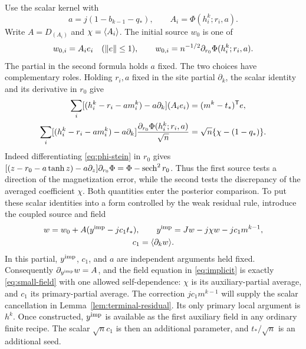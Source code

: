 Use the scalar kernel with
\begin{equation}
 a=j(1-b_{k-1}-q_*),\qquad A_i=\Phi(h_i^k;r_i,a).
 \label{eq:phi-data}
\end{equation}
Write $A=D_{(A_i)}$ and $\chi=\langle A_i\rangle$.  The initial source $w_0$
is one of
\[
 w_{0,i}=A_i e_i\quad(\lVert e\rVert\leq1),\qquad
 w_{0,i}=n^{-1/2}\partial_{r_0}\Phi(h_i^k;r_i,a).
\]
The partial in the second formula holds $a$ fixed. The two choices
have complementary roles. Holding $r_i,a$ fixed in the site partial
$\partial_k$, the scalar identity and its derivative in $r_0$ give
\begin{align}
 \sum_i[(h_i^k-r_i-am_i^k)-a\partial_k](A_i e_i)
   &=(m^k-t_*)^{\mathsf T}e,\notag\\
 \sum_i[(h_i^k-r_i-am_i^k)-a\partial_k]
   \frac{\partial_{r_0}\Phi(h_i^k;r_i,a)}{\sqrt n}
   &=\sqrt n\{\chi-(1-q_*)\}.
 \label{eq:implicit-source-actions}
\end{align}
Indeed differentiating \eqref{eq:phi-stein} in $r_0$ gives
$[(z-r_0-a\tanh z)-a\partial_z]\partial_{r_0}\Phi
=\Phi-\operatorname{sech}^2r_0$. Thus the first source tests a direction of the
magnetization error, while the second tests the discrepancy of the
averaged coefficient $\chi$. Both quantities enter the posterior
comparison. To put these scalar identities into a form controlled by the
weak residual rule, introduce the coupled source and field
\begin{equation}
 \begin{gathered}
 w=w_0+A(y^{\rm imp}-jc_1t_*),\qquad
 y^{\rm imp}=Jw-j\chi w-jc_1m^{k-1},\\
 c_1=\langle \partial_k w\rangle.
 \end{gathered}
 \label{eq:implicit}
\end{equation}
In this partial, $y^{\rm imp}$, $c_1$, and $a$ are independent arguments
held fixed.  Consequently $\partial_{y^{\rm imp}}w=A$, and the field
equation in \eqref{eq:implicit} is exactly \eqref{eq:small-field} with
one allowed self-dependence: $\chi$ is its auxiliary-partial average,
and $c_1$ its primary-partial average. The correction $jc_1m^{k-1}$
will supply the scalar cancellation in Lemma~\ref{lem:terminal-residual}.
Its only primary local argument is $h^k$.
Once constructed, $y^{\rm imp}$ is available as the first auxiliary field
in any ordinary finite recipe.  The scalar $\sqrt n c_1$ is then an
additional parameter, and $t_*/\sqrt n$ is an additional seed.

